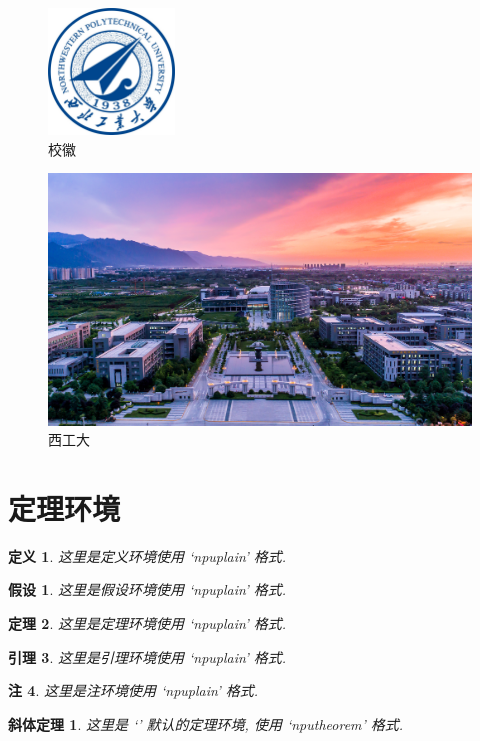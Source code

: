 \documentclass[twoside, UTF8, phd]{nputhesis}
\theoremstyle{npuplain}
\newtheorem{theorem}{定理}[section]
\newtheorem{lemma}[theorem]{引理}
\newtheorem{remark}[theorem]{注}
\newtheorem{definition}[theorem]{定义}
\newtheorem{assumption}{假设}
\theoremstyle{nputheorem}
\newtheorem{npu-thm}{斜体定理}[section]
\begin{document}
\begin{figure}[h!]
    \centering
    \includegraphics[width=0.3\textwidth]{figures/nwpu.jpg}
    \caption{校徽}
\end{figure}

\lipsum[2]

\begin{figure}[h!]
    \centering
    \includegraphics[width=.8\textwidth]{figures/campus.jpg}
    \caption{西工大}
\end{figure}
\lipsum[2]


\section{定理环境}
\begin{definition}
  这里是定义环境使用 `npuplain' 格式.
\end{definition}
\begin{assumption}
  这里是假设环境使用 `npuplain' 格式.
\end{assumption}
\begin{theorem}
  这里是定理环境使用 `npuplain' 格式.
\end{theorem}
\begin{lemma}
  这里是引理环境使用 `npuplain' 格式.
\end{lemma}
\begin{remark}
  这里是注环境使用 `npuplain' 格式.
\end{remark}
\begin{npu-thm}
  这里是 `' 默认的定理环境, 使用 `nputheorem' 格式.
\end{npu-thm}
\end{document}
